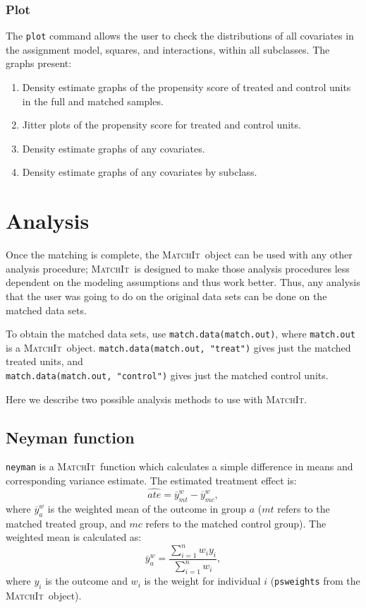 \documentclass[oneside,letterpaper,titlepage]{article}
\newcommand{\MatchIt}{\textsc{MatchIt}}
\begin{document}
\subsubsection{Plot}
The \texttt{plot} command allows the user to check the distributions
of all covariates in the assignment model, squares, and interactions,
within all subclasses.  The graphs present:
\begin{enumerate}
\item Density estimate graphs of the propensity score of treated and
  control units in the full and matched samples.
\item Jitter plots of the propensity score for treated and control
  units.
\item Density estimate graphs of any covariates.
\item Density estimate graphs of any covariates by subclass.
\end{enumerate}

\section{Analysis}

Once the matching is complete, the \MatchIt\ object can be used with
any other analysis procedure; \MatchIt\ is designed to make those
analysis procedures less dependent on the modeling assumptions and
thus work better.  Thus, any analysis that the user was going to do on
the original data sets can be done on the matched data sets.

To obtain the matched data sets, use {\tt match.data(match.out)},
where {\tt match.out} is a \MatchIt\ object.
{\tt match.data(match.out, "treat")} gives just the matched treated units, and \\
{\tt match.data(match.out, "control")} gives just the matched control
units.

Here we describe two possible analysis methods to use with \MatchIt.

\subsection{Neyman function}

{\tt neyman} is a \MatchIt\ function which calculates a simple
difference in means and corresponding variance estimate.  The
estimated treatment effect is:
\begin{equation}
\label{ate} 
\widehat{ate} = \overline{y}_{mt}^w-\overline{y}_{mc}^w,
\end{equation}
where $\overline{y}_a^w$ is the weighted mean of the outcome in group
$a$ ($mt$ refers to the matched treated group, and $mc$ refers to the
matched control group).  The weighted mean is calculated as:
$$\overline{y}_a^w = \frac{\sum_{i=1}^n w_i y_i}{\sum_{i=1}^n w_i},$$
where $y_i$ is the outcome and $w_i$ is the weight for individual $i$
({\tt psweights} from the \MatchIt\ object).
\end{document}
